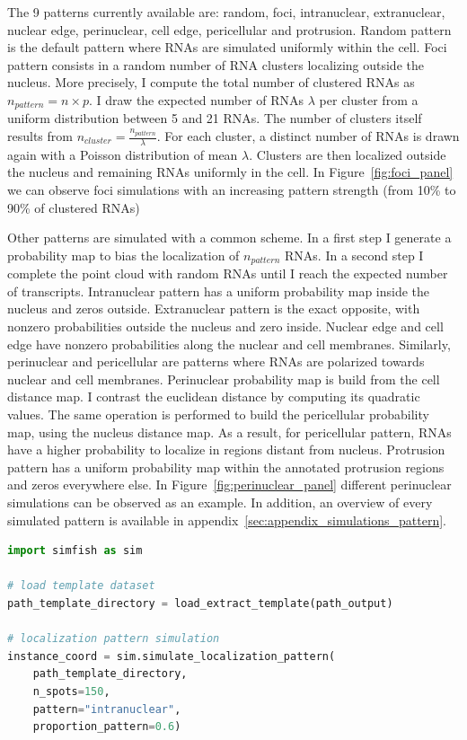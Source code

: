 The 9 patterns currently available are: random, foci, intranuclear, extranuclear, nuclear edge, perinuclear, cell edge, pericellular and protrusion.
Random pattern is the default pattern where \ac{RNA}s are simulated uniformly within the cell.
Foci pattern consists in a random number of \ac{RNA} clusters localizing outside the nucleus.
More precisely, I compute the total number of clustered \ac{RNA}s as $n_{pattern} = n \times p$.
I draw the expected number of \ac{RNA}s $\lambda$ per cluster from a uniform distribution between 5 and 21 \ac{RNA}s.
The number of clusters itself results from $n_{cluster}= \frac{n_{pattern}}{\lambda}$.
For each cluster, a distinct number of \ac{RNA}s is drawn again with a Poisson distribution of mean $\lambda$.
Clusters are then localized outside the nucleus and remaining \ac{RNA}s uniformly in the cell.
In Figure~\ref{fig:foci_panel} we can observe foci simulations with an increasing pattern strength (from 10\% to 90\% of clustered \ac{RNA}s)

Other patterns are simulated with a common scheme.
In a first step I generate a probability map to bias the localization of $n_{pattern}$ \ac{RNA}s.
In a second step I complete the point cloud with random \ac{RNA}s until I reach the expected number of transcripts.
Intranuclear pattern has a uniform probability map inside the nucleus and zeros outside.
Extranuclear pattern is the exact opposite, with nonzero probabilities outside the nucleus and zero inside.
Nuclear edge and cell edge have nonzero probabilities along the nuclear and cell membranes.
Similarly, perinuclear and pericellular are patterns where \ac{RNA}s are polarized towards nuclear and cell membranes.
Perinuclear probability map is build from the cell distance map.
I contrast the euclidean distance by computing its quadratic values.
The same operation is performed to build the pericellular probability map, using the nucleus distance map.
As a result, for pericellular pattern, \ac{RNA}s have a higher probability to localize in regions distant from nucleus.
Protrusion pattern has a uniform probability map within the annotated protrusion regions and zeros everywhere else.
In Figure~\ref{fig:perinuclear_panel} different perinuclear simulations can be observed as an example.
In addition, an overview of every simulated pattern is available in appendix~\ref{sec:appendix_simulations_pattern}.\\

\begin{minipage}{0.9\textwidth}
\begin{lstlisting}[language=Python]
import simfish as sim

# load template dataset
path_template_directory = load_extract_template(path_output)

# localization pattern simulation
instance_coord = sim.simulate_localization_pattern(
	path_template_directory,
	n_spots=150,
	pattern="intranuclear",
	proportion_pattern=0.6)
\end{lstlisting}
\end{minipage}


